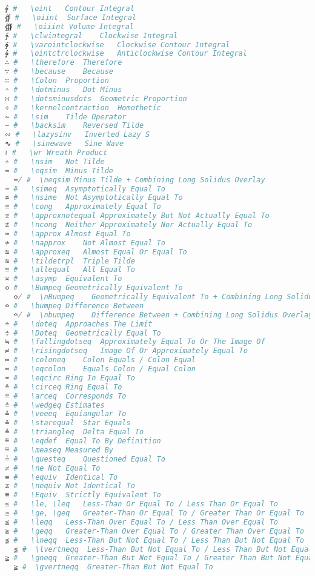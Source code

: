 \begin{lstlisting}[language=Julia, style=julia, linewidth=\textwidth]
∮ #   \oint   Contour Integral
∯ #   \oiint  Surface Integral
∰ #   \oiiint Volume Integral
∱ #   \clwintegral    Clockwise Integral
∲ #   \varointclockwise   Clockwise Contour Integral
∳ #   \ointctrclockwise   Anticlockwise Contour Integral
∴ #   \therefore  Therefore
∵ #   \because    Because
∷ #   \Colon  Proportion
∸ #   \dotminus   Dot Minus
∺ #   \dotsminusdots  Geometric Proportion
∻ #   \kernelcontraction  Homothetic
∼ #   \sim    Tilde Operator
∽ #   \backsim    Reversed Tilde
∾ #   \lazysinv   Inverted Lazy S
∿ #   \sinewave   Sine Wave
≀ #   \wr Wreath Product
≁ #   \nsim   Not Tilde
≂ #   \eqsim  Minus Tilde
  ≂̸ #  \neqsim Minus Tilde + Combining Long Solidus Overlay
≃ #   \simeq  Asymptotically Equal To
≄ #   \nsime  Not Asymptotically Equal To
≅ #   \cong   Approximately Equal To
≆ #   \approxnotequal Approximately But Not Actually Equal To
≇ #   \ncong  Neither Approximately Nor Actually Equal To
≈ #   \approx Almost Equal To
≉ #   \napprox    Not Almost Equal To
≊ #   \approxeq   Almost Equal Or Equal To
≋ #   \tildetrpl  Triple Tilde
≌ #   \allequal   All Equal To
≍ #   \asymp  Equivalent To
≎ #   \Bumpeq Geometrically Equivalent To
  ≎̸ #  \nBumpeq    Geometrically Equivalent To + Combining Long Solidus Overlay
≏ #   \bumpeq Difference Between
  ≏̸ #  \nbumpeq    Difference Between + Combining Long Solidus Overlay
≐ #   \doteq  Approaches The Limit
≑ #   \Doteq  Geometrically Equal To
≒ #   \fallingdotseq  Approximately Equal To Or The Image Of
≓ #   \risingdotseq   Image Of Or Approximately Equal To
≔ #   \coloneq    Colon Equals / Colon Equal
≕ #   \eqcolon    Equals Colon / Equal Colon
≖ #   \eqcirc Ring In Equal To
≗ #   \circeq Ring Equal To
≘ #   \arceq  Corresponds To
≙ #   \wedgeq Estimates
≚ #   \veeeq  Equiangular To
≛ #   \starequal  Star Equals
≜ #   \triangleq  Delta Equal To
≝ #   \eqdef  Equal To By Definition
≞ #   \measeq Measured By
≟ #   \questeq    Questioned Equal To
≠ #   \ne Not Equal To
≡ #   \equiv  Identical To
≢ #   \nequiv Not Identical To
≣ #   \Equiv  Strictly Equivalent To
≤ #   \le, \leq   Less-Than Or Equal To / Less Than Or Equal To
≥ #   \ge, \geq   Greater-Than Or Equal To / Greater Than Or Equal To
≦ #   \leqq   Less-Than Over Equal To / Less Than Over Equal To
≧ #   \geqq   Greater-Than Over Equal To / Greater Than Over Equal To
≨ #   \lneqq  Less-Than But Not Equal To / Less Than But Not Equal To
  ≨︀ #  \lvertneqq  Less-Than But Not Equal To / Less Than But Not Equal To + Variation Selector-1
≩ #   \gneqq  Greater-Than But Not Equal To / Greater Than But Not Equal To
  ≩︀ #  \gvertneqq  Greater-Than But Not Equal To

\end{lstlisting}
